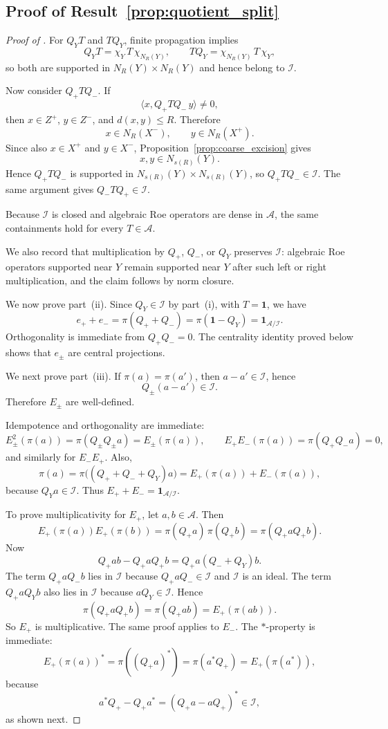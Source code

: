 \documentclass[11pt]{article}
\numberwithin{equation}{section}
\theoremstyle{definition}
\theoremstyle{remark}
\newcommand{\Id}{\mathbf{1}}
\begin{document}
\subsection{Proof of Result~\ref{prop:quotient_split}}\label{app:proof:prop:quotient_split}
\begin{proof}[Proof of ]
For $Q_YT$ and $TQ_Y$, finite propagation implies
\[
Q_YT=\chi_Y\,T\,\chi_{N_R(Y)},
\qquad
TQ_Y=\chi_{N_R(Y)}\,T\,\chi_Y,
\]
so both are supported in $N_R(Y)\times N_R(Y)$ and hence belong to $\mathcal I$.

Now consider $Q_+TQ_-$. If
\[
\langle x,Q_+TQ_-\,y\rangle\neq0,
\]
then $x\in Z^+$, $y\in Z^-$, and $d(x,y)\le R$. Therefore
\[
x\in N_R(X^-),\qquad y\in N_R(X^+).
\]
Since also $x\in X^+$ and $y\in X^-$, Proposition~\ref{prop:coarse_excision} gives
\[
x,y\in N_{s(R)}(Y).
\]
Hence $Q_+TQ_-$ is supported in $N_{s(R)}(Y)\times N_{s(R)}(Y)$, so $Q_+TQ_-\in\mathcal I$.
The same argument gives $Q_-TQ_+\in\mathcal I$.

Because $\mathcal I$ is closed and algebraic Roe operators are dense in $\mathcal A$, the same
containments hold for every $T\in\mathcal A$.

We also record that multiplication by $Q_+$, $Q_-$, or $Q_Y$ preserves $\mathcal I$: algebraic
Roe operators supported near $Y$ remain supported near $Y$ after such left or right multiplication,
and the claim follows by norm closure.

We now prove part~(ii). Since $Q_Y\in\mathcal I$ by part~(i), with $T=\Id$, we have
\[
e_++e_-=\pi(Q_++Q_-)=\pi(\Id-Q_Y)=\Id_{\mathcal A/\mathcal I}.
\]
Orthogonality is immediate from $Q_+Q_-=0$. The centrality identity proved below shows that
$e_\pm$ are central projections.

We next prove part~(iii). If $\pi(a)=\pi(a')$, then $a-a'\in\mathcal I$, hence
\[
Q_\pm(a-a')\in\mathcal I.
\]
Therefore $E_\pm$ are well-defined.

Idempotence and orthogonality are immediate:
\[
E_\pm^2(\pi(a))=\pi(Q_\pm Q_\pm a)=E_\pm(\pi(a)),
\qquad
E_+E_-(\pi(a))=\pi(Q_+Q_-a)=0,
\]
and similarly for $E_-E_+$. Also,
\[
\pi(a)=\pi\bigl((Q_++Q_-+Q_Y)a\bigr)=E_+(\pi(a))+E_-(\pi(a)),
\]
because $Q_Ya\in\mathcal I$. Thus $E_+ + E_- = \Id_{\mathcal A/\mathcal I}$.

To prove multiplicativity for $E_+$, let $a,b\in\mathcal A$. Then
\[
E_+(\pi(a))E_+(\pi(b))
=
\pi(Q_+a)\,\pi(Q_+b)
=
\pi(Q_+aQ_+b).
\]
Now
\[
Q_+ab-Q_+aQ_+b
=
Q_+a(Q_-+Q_Y)b.
\]
The term $Q_+aQ_-b$ lies in $\mathcal I$ because $Q_+aQ_-\in\mathcal I$ and $\mathcal I$ is an
ideal. The term $Q_+aQ_Yb$ also lies in $\mathcal I$ because $aQ_Y\in\mathcal I$. Hence
\[
\pi(Q_+aQ_+b)=\pi(Q_+ab)=E_+(\pi(ab)).
\]
So $E_+$ is multiplicative. The same proof applies to $E_-$. The $*$-property is immediate:
\[
E_+(\pi(a))^*=\pi((Q_+a)^*)=\pi(a^*Q_+)=E_+(\pi(a^*)),
\]
because
\[
a^*Q_+-Q_+a^*
=
(Q_+a-aQ_+)^*
\in\mathcal I,
\]
as shown next.


\end{proof}
\end{document}

